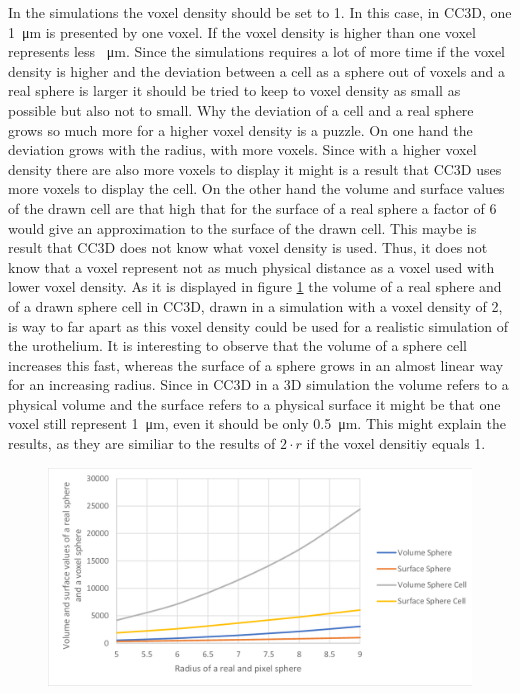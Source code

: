 In the simulations the voxel density should be set to 1. In this case, in \ac{CC3D}, one \SI{1}{\micro\metre} is presented by one voxel. If the voxel density is higher than one voxel represents less \SI{}{\micro\metre}. Since the simulations requires a lot of more time if the voxel density is higher and the deviation between a cell as a sphere out of voxels and a real sphere is larger it should be tried to keep to voxel density as small as possible but also not to small. Why the deviation of a cell and a real sphere grows so much more for a higher voxel density is a puzzle. On one hand the deviation grows with the radius, with more voxels. Since with a higher voxel density there are also more voxels to display it might is a result that \ac{CC3D} uses more voxels to display the cell. On the other hand the volume and surface values of the drawn cell are that high that for the surface of a real sphere a factor of 6 would give an approximation to the surface of the drawn cell. This maybe is result that \ac{CC3D} does not know what voxel density is used. Thus, it does not know that a voxel represent not as much physical distance as a voxel used with lower voxel density. As it is displayed in figure \ref{img:DeviationSphereCellRealSphere-vD2} the volume of a real sphere and of a drawn sphere cell in \ac{CC3D}, drawn in a simulation with a voxel density of 2, is way to far apart as this voxel density could be used for a realistic simulation of the urothelium. It is interesting to observe that the volume of a sphere cell increases this fast, whereas the surface of a sphere grows in an almost linear way for an increasing radius. Since in \ac{CC3D} in a 3D simulation the volume refers to a physical volume and the surface refers to a physical surface it might be that one voxel still represent \SI{1}{\micro\metre}, even it should be only \SI{0.5}{\micro\metre}. This might explain the results, as they are similiar to the results of $2 \cdot r$ if the voxel densitiy equals 1.
\begin{figure}
	\center
	\includegraphics[scale=0.3]{figures/DeviationSphereToPixelSphere-vD2.png}
	\caption{}
	\label{img:DeviationSphereCellRealSphere-vD2}
\end{figure}


